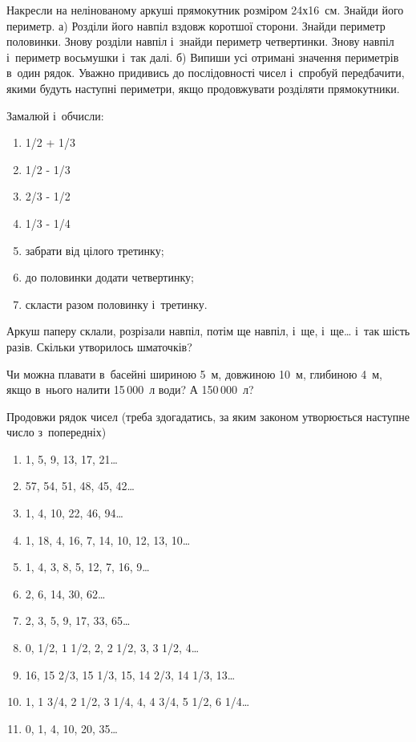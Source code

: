 \problem
Накресли на нелінованому аркуші прямокутник розміром 24х16~см.
Знайди його периметр.
а) Розділи його навпіл вздовж коротшої сторони.
Знайди периметр половинки.
Знову розділи навпіл і~знайди периметр четвертинки.
Знову навпіл і~периметр восьмушки і~так далі.
б) Випиши усі отримані значення периметрів в~один рядок.
Уважно придивись до послідовності чисел і~спробуй передбачити,
якими будуть наступні периметри, якщо продовжувати розділяти прямокутники.


\problem
Замалюй і~обчисли:
\begin{multicols}{2}
    \begin{enumerate}
        \item 1/2 + 1/3 
        \item 1/2 - 1/3 
        \item 2/3 - 1/2 
        \item 1/3 - 1/4 
        \item забрати від цілого третинку;
        \item до половинки додати четвертинку;
        \item скласти разом половинку і~третинку.
    \end{enumerate}
\end{multicols}


\problem
Аркуш паперу склали, розрізали навпіл, потім ще навпіл, і~ще, і~ще\ldots
і~так шість разів.
Скільки утворилось шматочків?


\problem
Чи можна плавати в~басейні шириною 5~м, довжиною 10~м, глибиною 4~м,
якщо в~нього налити 15\,000~л води? А 150\,000~л?


\problem
Продовжи рядок чисел (треба здогадатись, за яким законом утворюється
наступне число з~попередніх)
\begin{enumerate}
    \item 1, 5, 9, 13, 17, 21\ldots
    \item 57, 54, 51, 48, 45, 42\ldots
    \item 1, 4, 10, 22, 46, 94\ldots
    \item 1, 18, 4, 16, 7, 14, 10, 12, 13, 10\ldots
    \item 1, 4, 3, 8, 5, 12, 7, 16, 9\ldots
    \item 2, 6, 14, 30, 62\ldots
    \item 2, 3, 5, 9, 17, 33, 65\ldots
    \item 0, 1/2, 1 1/2, 2, 2 1/2, 3, 3 1/2, 4\ldots
    \item 16, 15 2/3, 15 1/3, 15, 14 2/3, 14 1/3, 13\ldots
    \item 1, 1 3/4, 2 1/2, 3 1/4, 4, 4 3/4, 5 1/2, 6 1/4\ldots
    \item 0, 1, 4, 10, 20, 35\ldots 
\end{enumerate}


